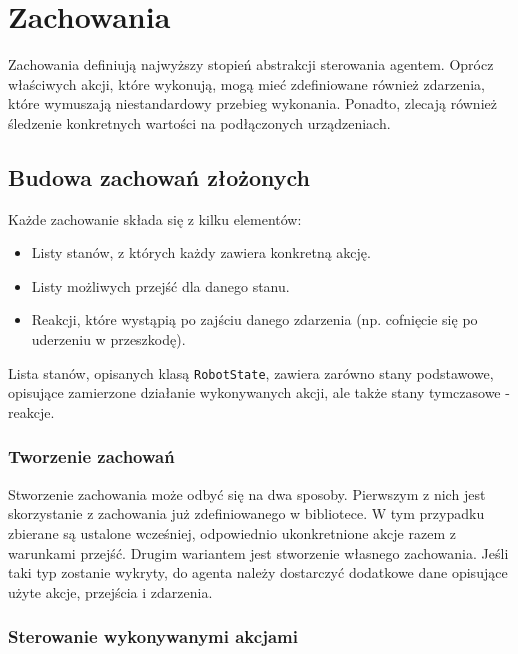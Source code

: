 \chapter{Zachowania}
\label{ch:zachowania}

Zachowania definiują najwyższy stopień abstrakcji sterowania agentem. Oprócz właściwych akcji, które wykonują, mogą mieć zdefiniowane również zdarzenia, które wymuszają niestandardowy przebieg wykonania. Ponadto, zlecają również śledzenie konkretnych wartości na podłączonych urządzeniach.

\section{Budowa zachowań złożonych}

Każde zachowanie składa się z kilku elementów:
\begin{itemize}
    \item Listy stanów, z których każdy zawiera konkretną akcję.
    \item Listy możliwych przejść dla danego stanu.
    \item Reakcji, które wystąpią po zajściu danego zdarzenia (np. cofnięcie się po uderzeniu w przeszkodę).
\end{itemize}

Lista stanów, opisanych klasą {\tt RobotState}, zawiera zarówno stany podstawowe, opisujące zamierzone działanie wykonywanych akcji, ale także stany tymczasowe - reakcje.

\subsection{Tworzenie zachowań}

Stworzenie zachowania może odbyć się na dwa sposoby. Pierwszym z nich jest skorzystanie z zachowania już zdefiniowanego w bibliotece. W tym przypadku zbierane są ustalone wcześniej, odpowiednio ukonkretnione akcje razem z warunkami przejść. Drugim wariantem jest stworzenie własnego zachowania. Jeśli taki typ zostanie wykryty, do agenta należy dostarczyć dodatkowe dane opisujące użyte akcje, przejścia i zdarzenia.


\subsection{Sterowanie wykonywanymi akcjami}

